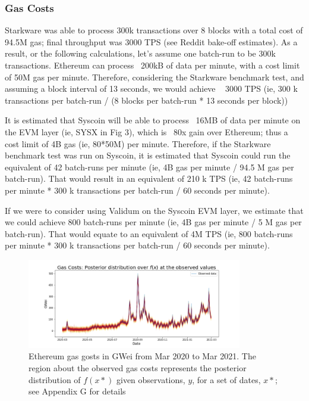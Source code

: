 \documentclass[peerreview]{ieeesyscoin}
\begin{document}
\subsubsection{Gas Costs}

Starkware was able to process 300k transactions over 8 blocks with a total cost of 94.5M gas; final throughput was 3000 TPS (see Reddit bake-off estimates). As a result, or the following calculations, let’s assume one batch-run to be 300k transactions.
Ethereum can process ~200kB of data per minute, with a cost limit of 50M gas per minute. Therefore, considering the Starkware benchmark test, and assuming a block interval of 13 seconds, we would achieve ~ 3000 TPS (ie,  300 k transactions per batch-run / (8 blocks per batch-run * 13 seconds per block))

It is estimated that Syscoin will be able to process ~16MB of data per minute on the EVM layer (ie, SYSX in Fig 3), which is ~80x gain over Ethereum; thus a cost limit of 4B gas (ie, 80*50M) per minute. Therefore, if the Starkware benchmark test was run on Syscoin, it is estimated that Syscoin could run the equivalent of 42 batch-runs per minute (ie, 4B gas per minute / 94.5 M gas per batch-run). That would result in an equivalent of 210 k TPS (ie, 42 batch-runs per minute * 300 k transactions per batch-run / 60 seconds per minute).

If we were to consider using Validum on the Syscoin EVM layer, we estimate that we could achieve 800 batch-runs per minute (ie, 4B gas per minute / 5 M gas per batch-run). That would equate to an equivalent of 4M TPS (ie, 800 batch-runs per minute * 300 k transactions per batch-run / 60 seconds per minute).

\begin{figure}[h!]
\includegraphics[width=3.7in]{img/eth_gas_costs.png}
\caption{Ethereum gas gosts in GWei from Mar 2020 to Mar 2021. The region about the observed gas costs represents the posterior distribution of $f(x*)$ given observations, $y$, for a set of dates, $x*$; see Appendix G for details}  
\label{fig:eth_gas_costs}
\end{figure} 
\end{document}
